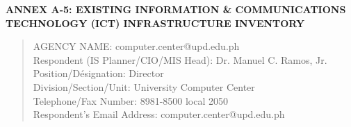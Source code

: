 \documentclass[a4paper, 10pt]{article}
\begin{document}
\begin{center}
\textsc{\large \textbf{ANNEX A-5: EXISTING INFORMATION \& COMMUNICATIONS}}\\[0.15cm]
\textsc{\large \textbf{TECHNOLOGY (ICT) INFRASTRUCTURE INVENTORY}}
\end{center}
\vspace{1em}
\begin{quote}
\begin{mdframed}
{\selectfont
AGENCY NAME: computer.center@upd.edu.ph\\
Respondent (IS Planner/CIO/MIS Head)\footnotemark[1]: Dr. Manuel C. Ramos, Jr.\\
Position/D\'esignation: Director\\
Division/Section/Unit: University Computer Center\\
Telephone/Fax Number: 8981-8500 local 2050\\
Respondent's Email Address: computer.center@upd.edu.ph\\
}
\end{mdframed}
\end{quote}
\end{document}
